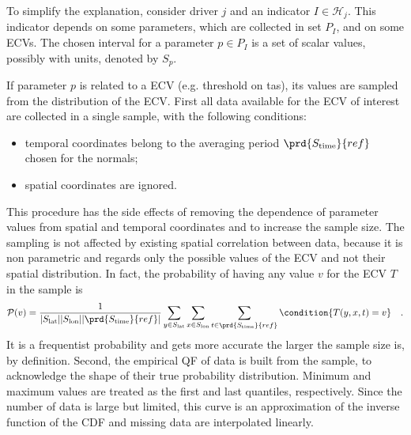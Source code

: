 To simplify the explanation, consider \gls{driver} $j$ and an \gls{indicator} $I \in \mathcal{H}_j$. This \gls{indicator} depends on some parameters, which are collected in set $P_I$, and on some \glspl{ECV}. The chosen interval for a parameter $p \in P_I$ is a set of scalar values, possibly with units, denoted by $S_p$.

If parameter $p$ is related to a \gls{ECV} (e.g. threshold on \gls{tas}), its values are sampled from the distribution of the \gls{ECV}. First all data available for the \gls{ECV} of interest are collected in a single sample, with the following conditions:
\begin{itemize}
  \item temporal coordinates belong to the averaging period $\prd{S_\text{time}}{ref}$ chosen for the \glspl{normal};
  \item spatial coordinates are ignored.
\end{itemize}
This procedure has the side effects of removing the dependence of parameter values from spatial and temporal coordinates and to increase the sample size. The sampling is not affected by existing spatial correlation between data, because it is non parametric and regards only the possible values of the \gls{ECV} and not their spatial distribution. In fact, the probability of having any value $v$ for the \gls{ECV} $T$ in the sample is
\begin{equation}
  \label{eq:variable_probability}
  \mathcal{P}(v) = \frac{1}{\abs{S_\text{lat}} \abs{S_\text{lon}} \abs{\prd{S_\text{time}}{ref}}} \sum_{y \in S_\text{lat}} \sum_{x \in S_\text{lon}} \sum_{t \in \prd{S_\text{time}}{ref}} \condition{T(y, x, t) = v}
  \quad .
\end{equation}
It is a frequentist probability and gets more accurate the larger the sample size is, by definition. %
Second, the empirical \gls{QF} of data is built from the sample, to acknowledge the shape of their true probability distribution. Minimum and maximum values are treated as the first and last quantiles, respectively. Since the number of data is large but limited, this curve is an approximation of the inverse function of the \gls{CDF} and missing data are interpolated linearly.
